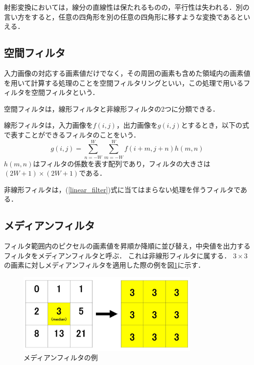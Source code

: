 \documentclass[openright]{nitocs}
\numberwithin{equation}{section}
\begin{document}
                射影変換においては，線分の直線性は保たれるものの，平行性は失われる．別の言い方をすると，任意の四角形を別の任意の四角形に移すような変換であるといえる．

        \subsection{空間フィルタ}
            入力画像の対応する画素値だけでなく，その周囲の画素も含めた領域内の画素値を用いて計算する処理のことを空間フィルタリングといい，この処理で用いるフィルタを空間フィルタという\cite{DIP}．
            
            空間フィルタは，線形フィルタと非線形フィルタの2つに分類できる．

            線形フィルタは，入力画像を$f(i,j)$，出力画像を$g(i,j)$とするとき，以下の式で表すことができるフィルタのことをいう．
            \begin{equation} \label{linear_filter}
                g(i,j) = \sum\limits_{n=-W}^{W}\sum\limits_{m=-W}^{W}f(i+m,j+n)h(m,n)
            \end{equation}
            $h(m,n)$はフィルタの係数を表す配列であり，フィルタの大きさは$(2W+1)\times(2W+1)$である．

            非線形フィルタは，(\ref{linear_filter})式に当てはまらない処理を伴うフィルタである．

        \subsection{メディアンフィルタ}
            フィルタ範囲内のピクセルの画素値を昇順か降順に並び替え，中央値を出力するフィルタをメディアンフィルタと呼ぶ\cite{DIP}．
            これは非線形フィルタに属する．
            $3\times3$の画素に対しメディアンフィルタを適用した際の例を図\ref{medianBlur}に示す．

            \begin{figure}[tb] %
                \begin{center}
                \includegraphics[clip,width=90mm]{medianBlur.jpg} 
                \caption{メディアンフィルタの例}
                \label{medianBlur}
                \end{center}
            \end{figure}
\end{document}
